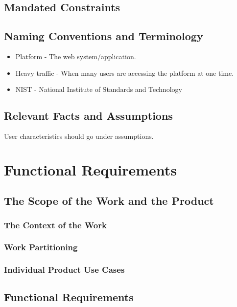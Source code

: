 \documentclass[12pt, titlepage]{article}
\begin{document}
\subsection{Mandated Constraints}

\subsection{Naming Conventions and Terminology}

\begin{itemize}
    \item Platform - The web system/application.
    \item Heavy traffic - When many users are accessing the platform at one time.
    \item NIST - National Institute of Standards and Technology
\end{itemize}

\subsection{Relevant Facts and Assumptions}

User characteristics should go under assumptions.

\section{Functional Requirements}

\subsection{The Scope of the Work and the Product}

\subsubsection{The Context of the Work}

\subsubsection{Work Partitioning}

\subsubsection{Individual Product Use Cases}

\subsection{Functional Requirements}
\end{document}

